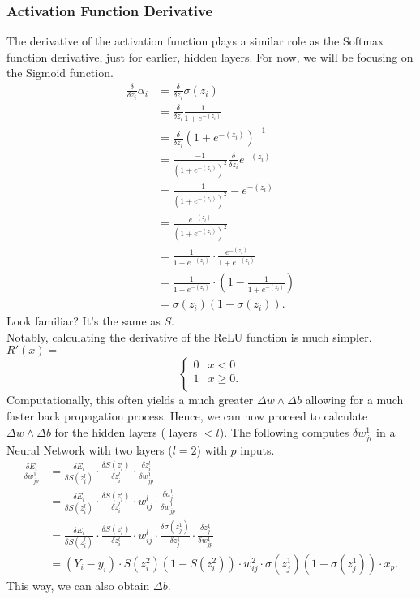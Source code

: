 \documentclass[11pt,letterpaper]{amsbook}
\theoremstyle{definition}
\numberwithin{definition}{chapter}
\numberwithin{exercise}{chapter}
\numberwithin{section}{chapter}
\newcommand{\ds}{\displaystyle}
\begin{document}
\subsubsection{Activation Function Derivative}
The derivative of the activation function plays a similar role as the Softmax function derivative, just for earlier, hidden layers. 
For now, we will be focusing on the Sigmoid function.
\begin{align}
    \frac{\delta}{\delta z_i}\alpha_i &= \frac{\delta}{\delta z_i}\sigma(z_i) \\
    &= \frac{\delta}{\delta z_i}\frac{1}{1 + e^{-(z_i)}} \\ &= \frac{\delta}{\delta z_i}(1 + e^{-(z_i)})^{-1} \\ &= \frac{-1}{(1+e^{-(z_i)})^2} \frac{\delta}{\delta z_i} e^{-(z_i)} \\ &= \frac{-1}{(1+e^{-(z_i)})^2} -e^{-(z_i)} \\ &= \frac{e^{-(z_i)}}{(1+e^{-(z_i)})^2} \\ &= \frac{1}{1 + e^{-(z_i)}} \cdot \frac{e^{-(z_i)}}{1 + e^{-(z_i)}} \\ &= \frac{1}{1 + e^{-(z_i)}} \cdot (1 - \frac{1}{1 + e^{-(z_i)}}) \\ &= \sigma(z_i)(1 - \sigma(z_i)).
\end{align}
Look familiar? It's the same as $S$. 
\\
Notably, calculating the derivative of the ReLU function is much simpler.
$R'(x) = $
\[ \begin{cases} 
      0 & x< 0 \\
      1 &  x\geq 0. \\
   \end{cases}
\]
Computationally, this often yields a much greater $\Delta w \land \Delta b$ allowing for a much faster back propagation process. 
\vspace{2em}
Hence, we can now proceed to calculate $\Delta w \land \Delta b$ for the hidden layers ( layers $< l$). The following computes $\ds \delta w^1_{ji}$ in a Neural Network with two layers ($l = 2$) with $p$ inputs.
\begin{align}
\frac{\delta E_i}{\delta w^1_{jp}} &=   \frac{\delta E_i}{\delta S(z^l_i)} \cdot \frac{\delta S(z^l_i)}{\delta z^l_i} \cdot \frac{\delta z^l_i}{\delta w^1_{jp}} \\
&= \frac{\delta E_i}{\delta S(z^l_i)} \cdot \frac{\delta S(z^l_i)}{\delta z^l_i} \cdot w^l_{ij} \cdot \frac{\delta a^1_j}{\delta w^1_{jp}} \\ &= \frac{\delta E_i}{\delta S(z^l_i)} \cdot \frac{\delta S(z^l_i)}{\delta z^l_i} \cdot w^l_{ij} \cdot \frac{\delta \sigma(z^1_j)}{\delta z^1_j} \cdot \frac{\delta z^1_j}{\delta w^1_{jp}} \\ &= (Y_i - y_i) \cdot S(z^2_i)(1 - S(z^2_i)) \cdot w^2_{ij} \cdot \sigma(z^1_j)(1 - \sigma(z^1_j)) \cdot x_p.
\end{align}
This way, we can also obtain $\Delta b$.
\end{document}
